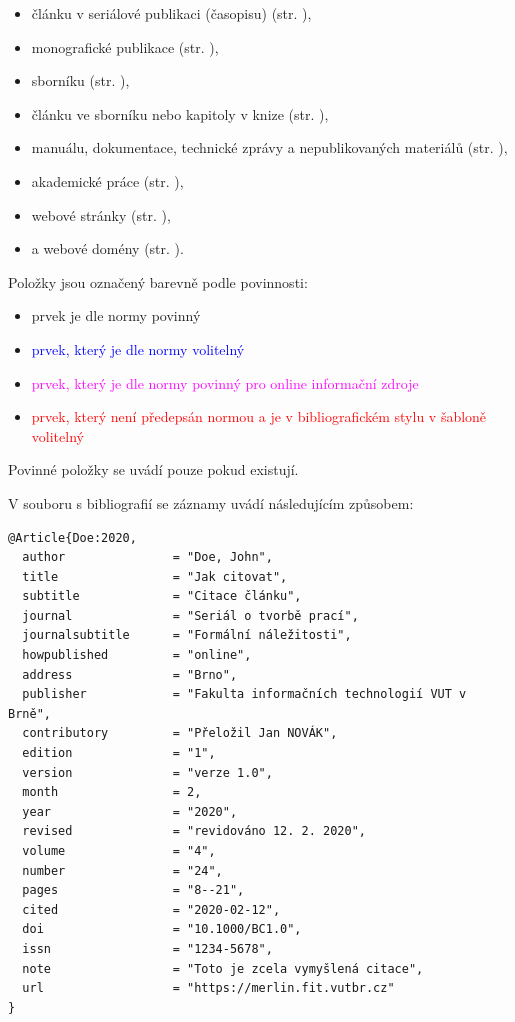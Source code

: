 \begin{itemize}
  \item článku v seriálové publikaci (časopisu) (str. \pageref{pr-casopis-clanek}),
  \item monografické publikace (str. \pageref{pr-monografie}),
  \item sborníku (str. \pageref{pr-sbornik}),
  \item článku ve sborníku nebo kapitoly v knize (str. \pageref{pr-kapitola}),
  \item manuálu, dokumentace, technické zprávy a nepublikovaných materiálů (str. \pageref{pr-manual}),
  \item akademické práce (str. \pageref{pr-thesis}),
  \item webové stránky (str. \pageref{pr-webpage}),
  \item a webové domény (str. \pageref{pr-website}).
\end{itemize}

\noindent Položky jsou označený barevně podle povinnosti:
\begin{itemize}
   \item prvek je dle normy povinný
   \item \textcolor{blue}{prvek, který je dle normy volitelný}
   \item \textcolor{magenta}{prvek, který je dle normy povinný pro online informační zdroje}
   \item \textcolor{red}{prvek, který není předepsán normou a je v bibliografickém stylu v šabloně volitelný}
\end{itemize}
Povinné položky se uvádí pouze pokud existují.

\newpage
\noindent V souboru s bibliografií se záznamy uvádí následujícím způsobem:
\begin{verbatim}
@Article{Doe:2020,
  author               = "Doe, John",
  title                = "Jak citovat",
  subtitle             = "Citace článku",
  journal              = "Seriál o tvorbě prací",
  journalsubtitle      = "Formální náležitosti",
  howpublished         = "online",
  address              = "Brno",
  publisher            = "Fakulta informačních technologií VUT v Brně",
  contributory         = "Přeložil Jan NOVÁK",
  edition              = "1",
  version              = "verze 1.0",
  month                = 2,
  year                 = "2020",
  revised              = "revidováno 12. 2. 2020",
  volume               = "4",
  number               = "24",
  pages                = "8--21",
  cited                = "2020-02-12",
  doi                  = "10.1000/BC1.0",
  issn                 = "1234-5678",
  note                 = "Toto je zcela vymyšlená citace",
  url                  = "https://merlin.fit.vutbr.cz"
}
\end{verbatim}

